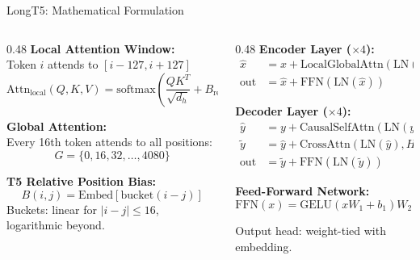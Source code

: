 \documentclass[10pt, aspectratio=169]{beamer}
\begin{document}
\begin{frame}{LongT5: Mathematical Formulation}
  \begin{columns}[T]
    \begin{column}{0.48\textwidth}
      \textbf{Local Attention Window:}\\
      Token $i$ attends to $[i-127, i+127]$
      \begin{equation}
        \text{Attn}_{\text{local}}(Q, K, V) = \text{softmax}\!\left(\frac{QK^T}{\sqrt{d_h}} + B_{\text{rel}}\right)V \nonumber
      \end{equation}

      \textbf{Global Attention:}\\
      Every 16th token attends to all positions:
      \begin{equation}
        G = \{0, 16, 32, \ldots, 4080\} \nonumber
      \end{equation}

      \textbf{T5 Relative Position Bias:}
      \begin{equation}
        B(i,j) = \text{Embed}\!\left[\text{bucket}(i-j)\right] \nonumber
      \end{equation}
      {\small Buckets: linear for $|i-j| \leq 16$, logarithmic beyond.}
    \end{column}
    \begin{column}{0.48\textwidth}
      \textbf{Encoder Layer ($\times 4$):}
      \begin{align}
        \hat{x} &= x + \text{LocalGlobalAttn}(\text{LN}(x)) \nonumber \\
        \text{out} &= \hat{x} + \text{FFN}(\text{LN}(\hat{x})) \nonumber
      \end{align}

      \textbf{Decoder Layer ($\times 4$):}
      \begin{align}
        \hat{y} &= y + \text{CausalSelfAttn}(\text{LN}(y)) \nonumber \\
        \tilde{y} &= \hat{y} + \text{CrossAttn}(\text{LN}(\hat{y}), H_{\text{enc}}) \nonumber \\
        \text{out} &= \tilde{y} + \text{FFN}(\text{LN}(\tilde{y})) \nonumber
      \end{align}

      \textbf{Feed-Forward Network:}
      \begin{equation}
        \text{FFN}(x) = \text{GELU}(xW_1 + b_1)W_2 + b_2 \nonumber
      \end{equation}

      {\small Output head: weight-tied with embedding.}
    \end{column}
  \end{columns}
\end{frame}
\end{document}
